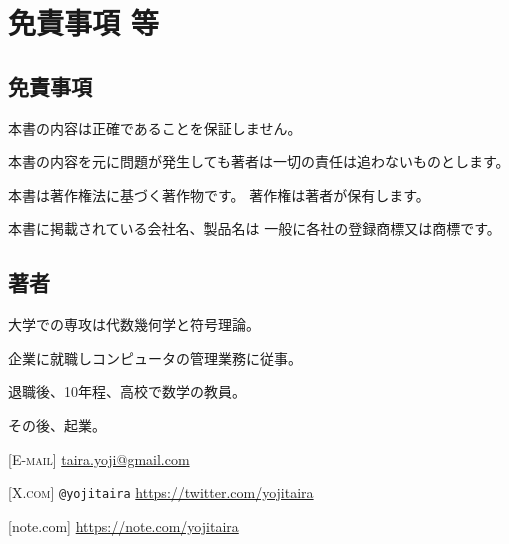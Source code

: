
\section{免責事項 等}

\subsection{免責事項}

本書の内容は正確であることを保証しません。

本書の内容を元に問題が発生しても著者は一切の責任は追わないものとします。

本書は著作権法に基づく著作物です。
著作権は著者が保有します。

本書に掲載されている会社名、製品名は
一般に各社の登録商標又は商標です。

\subsection{著者}

\textbf{\bookauthor}

大学での専攻は代数幾何学と符号理論。

企業に就職しコンピュータの管理業務に従事。

退職後、10年程、高校で数学の教員。

その後、起業。

%

[\textsc{E-mail}]
\url{taira.yoji@gmail.com}

[\textsc{X.com}]
\texttt{@yojitaira}
\url{https://twitter.com/yojitaira}

[note.com]
\url{https://note.com/yojitaira}\\



%
%
%


